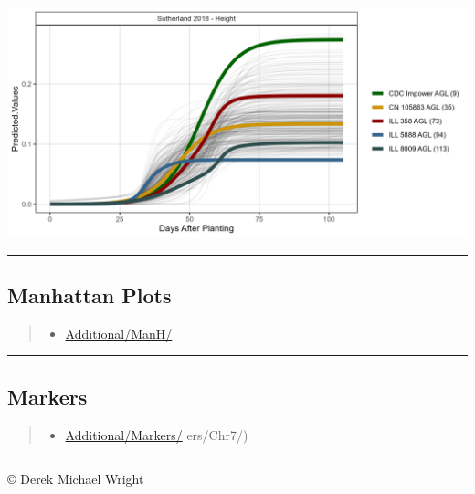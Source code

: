 \documentclass[
]{article}
\providecommand{\tightlist}{%
  \setlength{\itemsep}{0pt}\setlength{\parskip}{0pt}}
\begin{document}
\includegraphics{Additional/ggGrowthCurves_Su18_height.png}

\begin{center}\rule{0.5\linewidth}{0.5pt}\end{center}

\subsection{Manhattan Plots}\label{manhattan-plots}

\begin{quote}
\begin{itemize}
\tightlist
\item
  \href{https://github.com/derekmichaelwright/AGILE_LDP_UAV/Additional/ManH/}{Additional/ManH/}
\end{itemize}
\end{quote}

\begin{center}\rule{0.5\linewidth}{0.5pt}\end{center}

\subsection{Markers}\label{markers}

\begin{quote}
\begin{itemize}
\tightlist
\item
  \href{https://github.com/derekmichaelwright/AGILE_LDP_UAV/tree/main/Additional/Markers/}{Additional/Markers/}
  ers/Chr7/)
\end{itemize}
\end{quote}

\begin{center}\rule{0.5\linewidth}{0.5pt}\end{center}

© Derek Michael Wright
\end{document}
